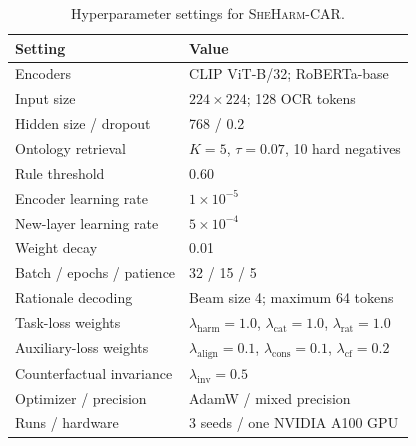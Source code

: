 \documentclass[11pt]{article}
\begin{document}
\begin{table}[t]
\centering
\small
\setlength{\tabcolsep}{3.5pt}
\renewcommand{\arraystretch}{1.04}
\begin{tabularx}{\columnwidth}{@{}lX@{}}
\toprule
\textbf{Setting} & \textbf{Value} \\
\midrule
Encoders
& CLIP ViT-B/32; RoBERTa-base \\

Input size
& $224\times224$; 128 OCR tokens \\

Hidden size / dropout
& 768 / 0.2 \\

Ontology retrieval
& $K=5$, $\tau=0.07$, 10 hard negatives \\

Rule threshold
& 0.60 \\

Encoder learning rate
& $1\times10^{-5}$ \\

New-layer learning rate
& $5\times10^{-4}$ \\

Weight decay
& 0.01 \\

Batch / epochs / patience
& 32 / 15 / 5 \\

Rationale decoding
& Beam size 4; maximum 64 tokens \\

Task-loss weights
& $\lambda_{\mathrm{harm}}=1.0$,
  $\lambda_{\mathrm{cat}}=1.0$,
  $\lambda_{\mathrm{rat}}=1.0$ \\

Auxiliary-loss weights
& $\lambda_{\mathrm{align}}=0.1$,
  $\lambda_{\mathrm{cons}}=0.1$,
  $\lambda_{\mathrm{cf}}=0.2$ \\

Counterfactual invariance
& $\lambda_{\mathrm{inv}}=0.5$ \\

Optimizer / precision
& AdamW / mixed precision \\

Runs / hardware
& 3 seeds / one NVIDIA A100 GPU \\
\bottomrule
\end{tabularx}
\caption{Hyperparameter settings for \textsc{SheHarm-CAR}.}
\label{tab:hyperparameters}
\end{table}

\end{document}
